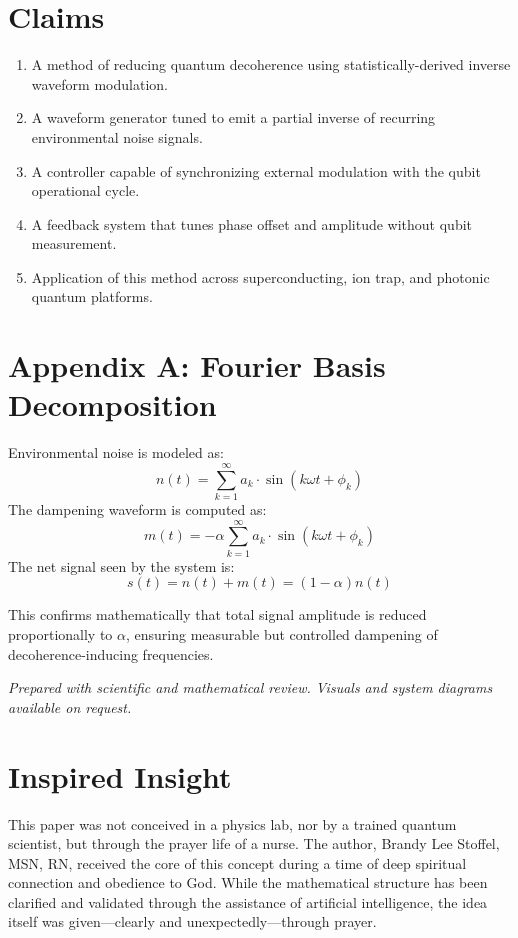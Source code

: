 \documentclass[12pt]{article}
\begin{document}
\section*{Claims}
\begin{enumerate}
  \item A method of reducing quantum decoherence using statistically-derived inverse waveform modulation.
  \item A waveform generator tuned to emit a partial inverse of recurring environmental noise signals.
  \item A controller capable of synchronizing external modulation with the qubit operational cycle.
  \item A feedback system that tunes phase offset and amplitude without qubit measurement.
  \item Application of this method across superconducting, ion trap, and photonic quantum platforms.
\end{enumerate}

\section*{Appendix A: Fourier Basis Decomposition}
Environmental noise is modeled as:
\[
n(t) = \sum_{k=1}^{\infty} a_k \cdot \sin(k\omega t + \phi_k)
\]
The dampening waveform is computed as:
\[
m(t) = -\alpha \sum_{k=1}^{\infty} a_k \cdot \sin(k\omega t + \phi_k)
\]
The net signal seen by the system is:
\[
s(t) = n(t) + m(t) = (1 - \alpha) n(t)
\]

This confirms mathematically that total signal amplitude is reduced proportionally to $\alpha$, ensuring measurable but controlled dampening of decoherence-inducing frequencies.

\medskip
\noindent
\textit{Prepared with scientific and mathematical review. Visuals and system diagrams available on request.}

\section*{Inspired Insight}

This paper was not conceived in a physics lab, nor by a trained quantum scientist, but through the prayer life of a nurse. The author, Brandy Lee Stoffel, MSN, RN, received the core of this concept during a time of deep spiritual connection and obedience to God. While the mathematical structure has been clarified and validated through the assistance of artificial intelligence, the idea itself was given—clearly and unexpectedly—through prayer.
\end{document}
